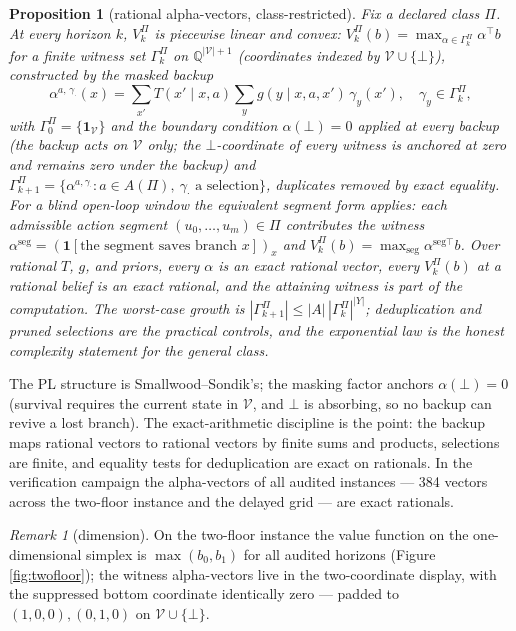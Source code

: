 \documentclass[10pt,twocolumn]{article}
\theoremstyle{plain}
\newtheorem{proposition}[theorem]{Proposition}
\theoremstyle{definition}
\theoremstyle{remark}
\newtheorem{remark}[theorem]{Remark}
\begin{document}
\begin{proposition}[rational alpha-vectors, class-restricted]\label{prop:pl}
Fix a declared class \(\Pi\). At every horizon \(k\),
\(V^{\Pi}_{k}\) is piecewise linear and convex:
\(V^{\Pi}_{k}(b) = \max_{\alpha \in \Gamma^{\Pi}_{k}} \alpha^{\top} b\)
for a finite witness set \(\Gamma^{\Pi}_{k}\) on
\(\mathbb{Q}^{|\mathcal{V}|+1}\) (coordinates indexed by
\(\mathcal{V} \cup \{\bot\}\)), constructed by the masked backup
\[
\alpha^{a,\,\gamma_{\cdot}}(x) =
\sum_{x'} T(x' \mid x, a) \sum_{y} g(y \mid x, a, x')\, \gamma_{y}(x'),\quad
\gamma_{y} \in \Gamma^{\Pi}_{k},
\]
with \(\Gamma^{\Pi}_{0} = \{ \mathbf{1}_{\mathcal{V}} \}\) and the
boundary condition \(\alpha(\bot) = 0\) applied at every backup (the
backup acts on \(\mathcal{V}\) only; the \(\bot\)-coordinate of every
witness is anchored at zero and remains zero under the backup) and
\(\Gamma^{\Pi}_{k+1} = \{ \alpha^{a, \gamma_{\cdot}} : a \in A(\Pi),\
\gamma_{\cdot} \text{ a selection} \}\), duplicates removed by exact
equality. For a blind open-loop window the equivalent segment form
applies: each admissible action segment \((u_{0}, \dots, u_{m}) \in \Pi\)
contributes the witness
\(\alpha^{\mathrm{seg}} = (\mathbf{1}[\text{the segment saves branch } x])_{x}\)
and \(V^{\Pi}_{k}(b) = \max_{\mathrm{seg}} \alpha^{\mathrm{seg}\top} b\).
Over rational \(T\), \(g\), and priors, every \(\alpha\) is an exact
rational vector, every \(V^{\Pi}_{k}(b)\) at a rational belief is an exact
rational, and the attaining witness is part of the computation. The
worst-case growth is
\(|\Gamma^{\Pi}_{k+1}| \le |A|\,|\Gamma^{\Pi}_{k}|^{|Y|}\);
deduplication and pruned selections are the practical controls, and the
exponential law is the honest complexity statement for the general class.
\end{proposition}

The PL structure is Smallwood--Sondik's; the masking factor anchors
\(\alpha(\bot) = 0\) (survival requires the current state in
\(\mathcal{V}\), and \(\bot\) is absorbing, so no backup can revive a lost
branch). The exact-arithmetic discipline is the point: the backup maps
rational vectors to rational vectors by finite sums and products,
selections are finite, and equality tests for deduplication are exact on
rationals. In the verification campaign the alpha-vectors of all audited
instances --- 384 vectors across the two-floor instance and the delayed
grid --- are exact rationals.

\begin{remark}[dimension]\label{rem:dim}
On the two-floor instance the value function on the one-dimensional
simplex is \(\max(b_{0}, b_{1})\) for all audited horizons (Figure
\ref{fig:twofloor}); the witness alpha-vectors live in the two-coordinate
display, with the suppressed bottom coordinate identically zero --- padded
to \((1,0,0), (0,1,0)\) on \(\mathcal{V} \cup \{\bot\}\).
\end{remark}
\end{document}
